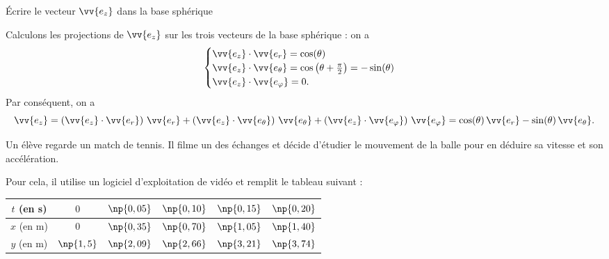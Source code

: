 	\begin{enonce}
		Écrire le vecteur $\vv{e_z}$ dans la base sphérique
	\end{enonce}


\begin{corrige}
Calculons les projections de $\vv{e_z}$ sur les trois vecteurs de la base sphérique : on a
\[
\begin{cases}
\vv{e_z}\cdot\vv{e_r}=\cos(\theta) \\
\vv{e_z}\cdot\vv{e_\theta}=\cos\left(\theta+\frac{\pi}{2}\right)=-\sin(\theta)\\%
\vv{e_z}\cdot\vv{e_\varphi}=0.
\end{cases}
\]
Par conséquent, on a
\[
\vv{e_z}=\left(\vv{e_z}\cdot\vv{e_r}\right)\,\vv{e_r}+
\left(\vv{e_z}\cdot\vv{e_\theta}\right)\,\vv{e_\theta}+
\left(\vv{e_z}\cdot\vv{e_\varphi}\right)\,\vv{e_\varphi}=
\cos(\theta)\,\vv{e_r}-\sin(\theta)\,\vv{e_\theta}.
\]
\end{corrige}


\finEntrainement






\hauteurLargeurCadreReponse		{8mm}{4cm}
\initialisationEntrainement

Un élève regarde un match de tennis. Il filme un des échanges et décide d'étudier le mouvement de la balle pour en déduire sa vitesse et son accélération.
 
Pour cela, il utilise un logiciel d'exploitation de vidéo et remplit le tableau suivant :
\begin{center}
\renewcommand*{\arraystretch}{1.2}
	\begin{tabular}{|c|c|c|c|c|c|}
		\hline
		$t$ (en \si{s})	& $0$ & $\np{0,05}$ & $\np{0,10}$ & $\np{0,15}$  & $\np{0,20}$ \\
		\hline
		$x$ (en \si{m}) & $0$ & $\np{0,35}$ & $\np{0,70}$ & $\np{1,05}$ & $\np{1,40}$ \\
		\hline
		$y$ (en \si{m}) & $\np{1,5}$ & $\np{2,09}$ & $\np{2,66}$ & $\np{3,21}$ & $\np{3,74}$ \\
		\hline
	\end{tabular}
\renewcommand*{\arraystretch}{1}
\end{center}

